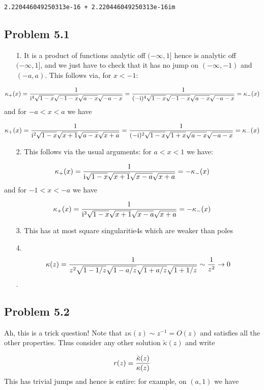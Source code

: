 \documentclass[12pt,a4paper]{article}
\def\I{ {\rm i} }
\begin{document}
\begin{lstlisting}
2.220446049250313e-16 + 2.220446049250313e-16im
\end{lstlisting}


\subsection{Problem 5.1}
\begin{itemize}
\item[1. ] It is a product of functions analytic off $(-\infty,1]$ hence is analytic off $(-\infty,1]$, and we just have to check that it has no jump on $(-\infty,-1)$ and $(-a,a)$. This follows via, for $x < -1$:

\end{itemize}
\[
\kappa_+(x) = {1 \over \I^4 \sqrt{1-x}\sqrt{-1-x}\sqrt{a-x}\sqrt{-a-x}} = {1 \over (-\I)^4 \sqrt{1-x}\sqrt{-1-x}\sqrt{a-x}\sqrt{-a-x}} = \kappa_-(x)
\]
and for $-a < x < a$ we have

\[
\kappa_+(x) = {1 \over \I^2 \sqrt{1-x}\sqrt{x+1}\sqrt{a-x}\sqrt{x+a}} = {1 \over (-\I)^2 \sqrt{1-x}\sqrt{1+x}\sqrt{a-x}\sqrt{-a-x}} = \kappa_-(x)
\]
\begin{itemize}
\item[2. ] This follows via the usual arguments: for $a < x < 1$ we have:

\end{itemize}
\[
\kappa_+(x) = {1 \over \I \sqrt{1-x}\sqrt{x+1}\sqrt{x-a}\sqrt{x+a}} =  -\kappa_-(x)
\]
and for $-1 < x < -a$ we have

\[
\kappa_+(x) = {1 \over \I^3 \sqrt{1-x}\sqrt{x+1}\sqrt{x-a}\sqrt{x+a}} =  -\kappa_-(x)
\]
\begin{itemize}
\item[3. ] This has at most square singularitie4s which are weaker than poles


\item[4. ] \[
\kappa(z) = {1 \over z^2 \sqrt{1-1/z}\sqrt{1-a/z} \sqrt{1+a/z} \sqrt{1+1/z}} \sim {1 \over z^2} \rightarrow 0
\]
.

\end{itemize}
\subsection{Problem 5.2}
Ah, this is a trick question! Note that $z \kappa(z) \sim z^{-1} = O(z)$ and satisfies all the other properties. Thus consider any other solution $\tilde \kappa(z)$ and write

\[
r(z) = {\tilde \kappa(z) \over \kappa(z) }
\]
This has trivial jumps and hence is entire: for example, on $(a,1)$ we have
\end{document}
